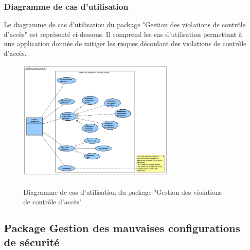 \subsubsection{Diagramme de cas d'utilisation}
Le diagramme de cas d'utilisation du package "Gestion des violations de contrôle d'accès" est représenté ci-dessous. Il comprend les cas d'utilisation permettant à une application donnée de mitiger les risques découlant des violations de contrôle d'accès.\\ 
\begin{figure}[H]
	\centering
	\begin{minipage}{18cm}
		\centering
		{\includegraphics[width=0.7\textwidth,height=0.30\textheight]{fig/Violation-controle-acces-use-case-diagram.png}}
	\end{minipage}
	\caption{Diagramme de cas d'utilisation du package "Gestion des violations de contrôle d'accès"}
	\label{fig:7.6}
\end{figure}

\subsection{Package Gestion des mauvaises configurations de sécurité}

